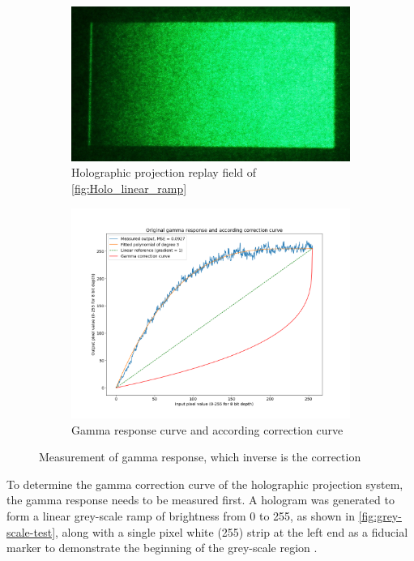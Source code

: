 \begin{figure}[H]
  \begin{subfigure}[c]{0.32\textwidth}
    \includegraphics[width=\textwidth]{Replay field of holographic projection of linear ramp.jpg}
    \caption{Holographic projection replay field of \cref{fig:Holo_linear_ramp}}\label{fig:Replay field of holographic projection of linear ramp}
  \end{subfigure}

  \begin{subfigure}[c]{0.6\textwidth}
    \includegraphics[width=\textwidth]{GammaResponseOriginal.png}
    \caption{Gamma response curve and according correction curve}\label{fig:GammaResponseOriginal}
  \end{subfigure}

  \caption{Measurement of gamma response, which inverse is the correction}
\end{figure}

To determine the gamma correction curve of the holographic projection system, the gamma response needs to be measured first. A hologram was generated to form a linear grey-scale ramp of brightness from 0 to 255, as shown in \cref{fig:grey-scale-test}, along with a single pixel white (255) strip at the left end as a fiducial marker to demonstrate the beginning of the grey-scale region \cite{Cable2006}.

